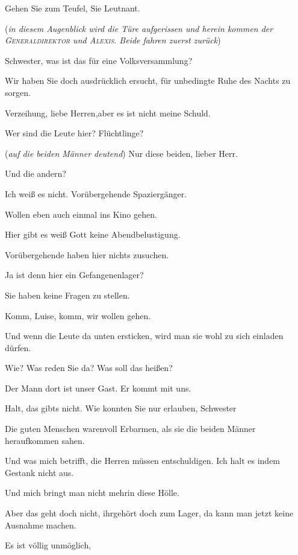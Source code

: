 \documentclass[
	final,
	a4paper,
	ngerman,
	mpinclude = true, %
	twoside = true,
	open = right,
	cleardoublepage = plain,
	DIV = 13,
	BCOR = 1cm,
	titlepage = firstiscover,
	]{scrbook}
\newcommand{\direction}[1]{(\textit{#1})}
\newcommand{\thecharacter}[1]{\textup{\textsc{#1}}\xspace}
\newcommand{\theGregor}{\thecharacter{Gregor}}
\newcommand{\theJan}{\thecharacter{Jan}}
\newcommand{\theLuise}{\thecharacter{Luise}}
\newcommand{\theGeneraldirektor}{\thecharacter{Generaldirektor}}
\newcommand{\theAlexis}{\thecharacter{Alexis}}
\newcommand{\character}[1]{\item[#1]}
\newcommand{\Gregor}{\character{\theGregor}}
\newcommand{\Jan}{\character{\theJan}}
\newcommand{\Luise}{\character{\theLuise}}
\newcommand{\Generaldirektor}{\character{Direktor}}
\newcommand{\Alexis}{\character{\theAlexis}}
\newcommand{\Heilsarmeeschwester}{\character{Schwester}}
\newcommand{\ErsterMann}{\character{1. Mann}}
\newcommand{\ZweiterMann}{\character{2. Mann}}
\begin{document}
\begin{play}
Gehen Sie zum Teufel, Sie Leutnant.

\direction{in diesem Augenblick wird die Türe aufgerissen und herein kommen der \theGeneraldirektor und \theAlexis. Beide fahren zuerst zurück}

\Alexis
Schwester, was ist das für eine Volksversammlung?

\Generaldirektor
Wir haben Sie doch ausdrücklich ersucht, für unbedingte Ruhe des Nachts zu sorgen.

\Heilsarmeeschwester
Verzeihung, liebe Herren,aber es ist nicht meine Schuld.

\Alexis
Wer sind die Leute hier? Flüchtlinge?

\Heilsarmeeschwester
\direction{auf die beiden Männer deutend} Nur diese beiden, lieber Herr.

\Generaldirektor
Und die andern?

\Heilsarmeeschwester
Ich weiß es nicht. Vorübergehende Spaziergänger.

\Jan
Wollen eben auch einmal ins Kino gehen.

\Generaldirektor
Hier gibt es weiß Gott keine Abendbelustigung.

\Alexis
Vorübergehende haben hier nichts zusuchen.

\Luise
Ja ist denn hier ein Gefangenenlager?

\Alexis
Sie haben keine Fragen zu stellen.

\Gregor
Komm, Luise, komm, wir wollen gehen.

\Luise
Und wenn die Leute da unten ersticken, wird man sie wohl zu sich einladen dürfen.

\Generaldirektor
Wie? Was reden Sie da? Was soll das heißen?

\Luise
Der Mann dort ist unser Gast. Er kommt mit uns.

\Alexis
Halt, das gibts nicht. Wie konnten Sie nur erlauben, Schwester

\Heilsarmeeschwester
Die guten Menschen warenvoll Erbarmen, als sie die beiden Männer heraufkommen sahen.

\ErsterMann
Und was mich betrifft, die Herren müssen entschuldigen. Ich halt es indem Gestank nicht aus.

\ZweiterMann
Und mich bringt man nicht mehrin diese Hölle.

\Generaldirektor
Aber das geht doch nicht, ihrgehört doch zum Lager, da kann man jetzt keine Ausnahme machen.

\Alexis
Es ist völlig unmöglich,


\end{play}
\end{document}
